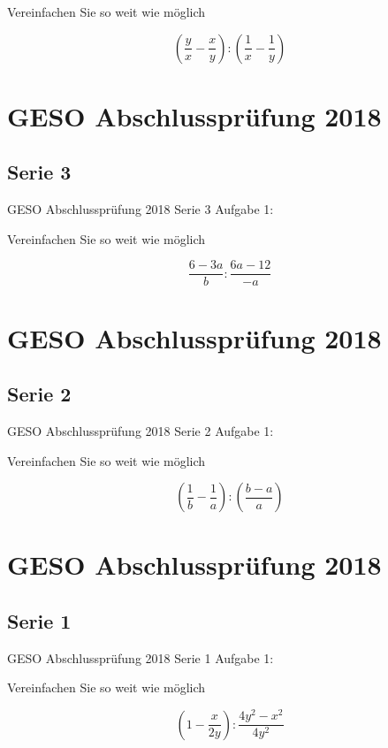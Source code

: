 Vereinfachen Sie so weit wie möglich

$$\left( \frac{y}{x} - \frac{x}{y} \right) : \left( \frac1{x}  - \frac1{y}  \right)$$




\section*{GESO Abschlussprüfung 2018}
\subsection*{Serie 3}
GESO Abschlussprüfung 2018 Serie 3 Aufgabe 1:

Vereinfachen Sie so weit wie möglich

$$\frac{6-3a}{b} : \frac{6a-12}{-a}$$




\section*{GESO Abschlussprüfung 2018}
\subsection*{Serie 2}
GESO Abschlussprüfung 2018 Serie 2 Aufgabe 1:

Vereinfachen Sie so weit wie möglich

$$\left(\frac1b - \frac1a \right) : \left( \frac{b-a}{a}  \right)$$




\section*{GESO Abschlussprüfung 2018}
\subsection*{Serie 1}
GESO Abschlussprüfung 2018 Serie 1 Aufgabe 1:

Vereinfachen Sie so weit wie möglich

$$\left(1 - \frac{x}{2y} \right) : \frac{4y^2-x^2}{4y^2}$$



